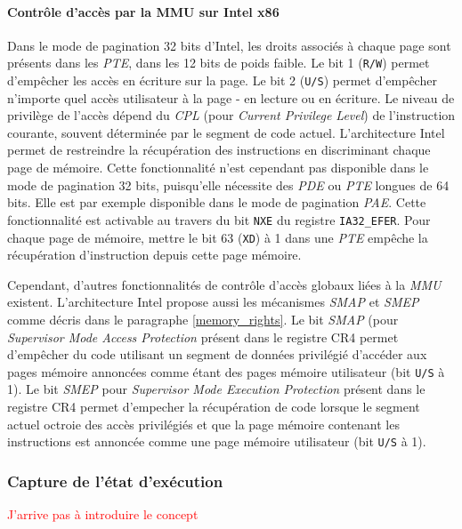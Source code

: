 \paragraph{Contrôle d'accès par la MMU sur Intel x86}
Dans le mode de pagination 32 bits d'Intel, les droits associés à chaque page sont présents dans les \emph{PTE}, dans les 12 bits de poids faible. Le bit 1 (\texttt{R/W}) permet d'empêcher les accès en écriture sur la page. Le bit 2 (\texttt{U/S}) permet d'empêcher n'importe quel accès utilisateur à la page - en lecture ou en écriture. Le niveau de privilège de l'accès dépend du \emph{CPL} (pour \emph{Current Privilege Level}) de l'instruction courante, souvent déterminée par le segment de code actuel.
L'architecture Intel permet de restreindre la récupération des instructions en discriminant chaque page de mémoire. Cette fonctionnalité n'est cependant pas disponible dans le mode de pagination 32 bits, puisqu'elle nécessite des \emph{PDE} ou \emph{PTE} longues de 64 bits. Elle est par exemple disponible dans le mode de pagination \emph{PAE}. Cette fonctionnalité est activable au travers du bit \texttt{NXE} du registre \texttt{IA32\_EFER}. Pour chaque page de mémoire, mettre le bit 63 (\texttt{XD}) à 1 dans une \emph{PTE} empêche la récupération d'instruction depuis cette page mémoire.

Cependant, d'autres fonctionnalités de contrôle d'accès globaux liées à la \emph{MMU} existent. L'architecture Intel propose aussi les mécanismes \emph{SMAP} et \emph{SMEP} comme décris dans le paragraphe \ref{memory_rights}.
Le bit \emph{SMAP} (pour \emph{Supervisor Mode Access Protection} présent dans le registre CR4 permet d'empêcher du code utilisant un segment de données privilégié d'accéder aux pages mémoire annoncées comme étant des pages mémoire utilisateur (bit \texttt{U/S} à 1).
Le bit \emph{SMEP} pour \emph{Supervisor Mode Execution Protection} présent dans le registre CR4 permet d'empecher la récupération de code lorsque le segment actuel octroie des accès privilégiés et que la page mémoire contenant les instructions est annoncée comme une page mémoire utilisateur (bit \texttt{U/S} à 1).


			\subsubsection{Capture de l'état d'exécution}

\textcolor{red}{J'arrive pas à introduire le concept}

